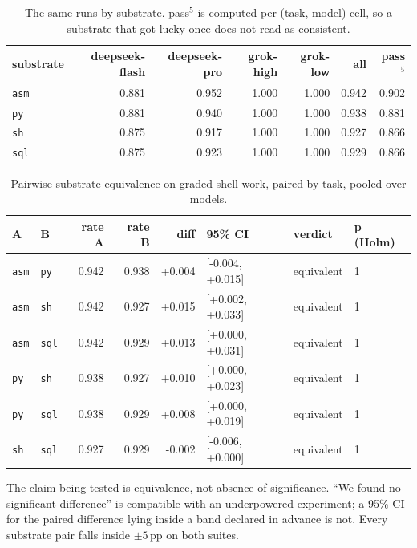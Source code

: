\documentclass[11pt,a4paper]{article}
\begin{document}
\begin{table}[h]\centering\small
\caption{The same runs by substrate. pass$^5$ is computed per
(task, model) cell, so a substrate that got lucky once does not read as
consistent.}
\label{tab:localkernel}
\begin{tabular}{lrrrrrr}
\toprule
substrate & deepseek-flash & deepseek-pro & grok-high & grok-low & all & pass$^5$ \\
\midrule
\texttt{asm} & 0.881 & 0.952 & 1.000 & 1.000 & 0.942 & 0.902 \\
\texttt{py} & 0.881 & 0.940 & 1.000 & 1.000 & 0.938 & 0.881 \\
\texttt{sh} & 0.875 & 0.917 & 1.000 & 1.000 & 0.927 & 0.866 \\
\texttt{sql} & 0.875 & 0.923 & 1.000 & 1.000 & 0.929 & 0.866 \\
\bottomrule
\end{tabular}
\end{table}

\begin{table}[h]\centering\small
\caption{Pairwise substrate equivalence on graded shell work, paired by task,
pooled over models.}
\label{tab:localequiv}
\begin{tabular}{llrrrlll}
\toprule
A & B & rate A & rate B & diff & 95\% CI & verdict & p (Holm) \\
\midrule
\texttt{asm} & \texttt{py} & 0.942 & 0.938 & +0.004 & [-0.004, +0.015] & equivalent & 1 \\
\texttt{asm} & \texttt{sh} & 0.942 & 0.927 & +0.015 & [+0.002, +0.033] & equivalent & 1 \\
\texttt{asm} & \texttt{sql} & 0.942 & 0.929 & +0.013 & [+0.000, +0.031] & equivalent & 1 \\
\texttt{py} & \texttt{sh} & 0.938 & 0.927 & +0.010 & [+0.000, +0.023] & equivalent & 1 \\
\texttt{py} & \texttt{sql} & 0.938 & 0.929 & +0.008 & [+0.000, +0.019] & equivalent & 1 \\
\texttt{sh} & \texttt{sql} & 0.927 & 0.929 & -0.002 & [-0.006, +0.000] & equivalent & 1 \\
\bottomrule
\end{tabular}
\end{table}

The claim being tested is equivalence, not absence of significance. ``We found
no significant difference'' is compatible with an underpowered experiment; a
95\% CI for the paired difference lying inside a band declared in advance is
not. Every substrate pair falls inside $\pm5$\,pp on both suites.
\end{document}
